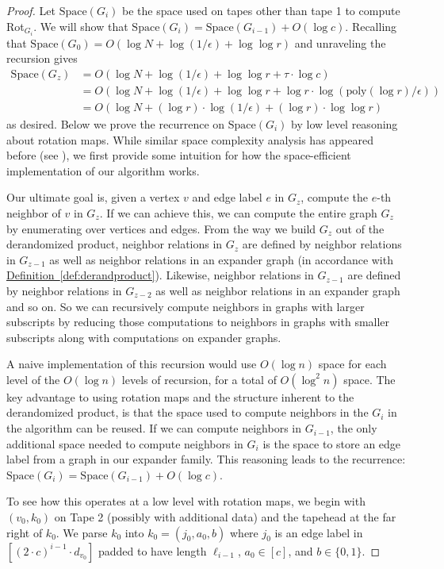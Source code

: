 \documentclass[11pt]{article}
\numberwithin{equation}{section}
\theoremstyle{definition}
\theoremstyle{plain}
\newcommand{\expref}[2]{\hyperref[#2]{#1~\ref{#2}}}
\newcommand{\Space}{\mathrm{Space}}
\numberwithin{myalgctr}{section}
\theoremstyle{named}
\begin{document}
\begin{proof}
Let $\Space(G_i)$ be the space used on tapes other than tape 1 to compute Rot$_{G_i}$. We will show that $\Space(G_i)=\Space(G_{i-1}) + O(\log c)$. Recalling that $\Space(G_0)=O(\log N+\log(1/\epsilon)+\log\log r)$ and unraveling the recursion gives 
\begin{align*}
\Space(G_{z})&=O(\log N +\log(1/\epsilon)+\log\log r+ \tau\cdot \log c)\\
&=O(\log N + \log(1/\epsilon)+\log\log r+ \log r\cdot\log(\mathrm{poly}(\log r)/\epsilon))\\
&= O(\log N + (\log r)\cdot\log(1/\epsilon)+(\log r)\cdot \log\log r)
\end{align*}
as desired. Below we prove the recurrence on $\Space(G_i)$ by low level reasoning about rotation maps. While similar space complexity analysis has appeared before (see \cite{Reingold08, RozenmanVa05, derandbeyond2017}), we first provide some intuition for how the space-efficient implementation of our algorithm works.

Our ultimate goal is, given a vertex $v$ and edge label $e$ in $G_z$, compute the $e$-th neighbor of $v$ in $G_z$. If we can achieve this, we can compute the entire graph $G_z$ by enumerating over vertices and edges. {}From the way we build $G_z$ out of the derandomized product, neighbor relations in $G_z$ are defined by neighbor relations in $G_{z-1}$ as well as neighbor relations in an expander graph (in accordance with \expref{Definition}{def:derandproduct}). Likewise, neighbor relations in $G_{z-1}$ are defined by neighbor relations in $G_{z-2}$ as well as neighbor relations in an expander graph and so on. So we can recursively compute neighbors in graphs with larger subscripts by reducing those computations to neighbors in graphs with smaller subscripts along with computations on expander graphs.

A naive implementation of this recursion would use $O(\log n)$ space for each level of the $O(\log n)$ levels of recursion, for a total of $O(\log^2 n)$ space. The key advantage to using rotation maps and the structure inherent to the derandomized product, is that the space used to compute neighbors in
%
the $G_i$  %
in the algorithm can be reused. If we can compute neighbors in $G_{i-1}$, the only additional space needed to compute neighbors in $G_i$ is the space to store an edge label from a graph in our expander family. This reasoning leads to the recurrence: $\Space(G_i)=\Space(G_{i-1}) + O(\log c)$. 

To see how this operates at a low level with rotation maps, we begin with $(v_0, k_0)$ on Tape 2 (possibly with additional data) and the tapehead at the far right of $k_0$. We parse $k_0$ into $k_0=(j_0, a_0, b)$ where $j_0$ is an edge label in $[(2\cdot c)^{i-1}\cdot d_{v_0}]$ padded to have length $\ell_{i-1}$, $a_0\in [c]$, and $b\in\{0,1\}$. 


\end{proof}
\end{document}
